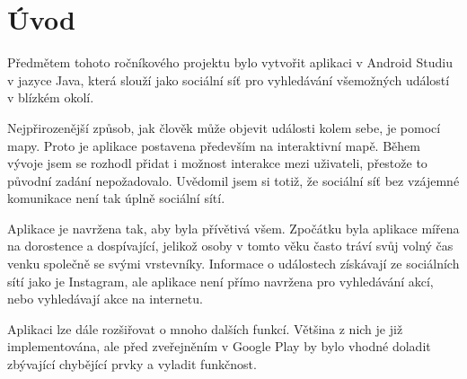 \chapter{Úvod}
Předmětem tohoto ročníkového projektu bylo vytvořit aplikaci v Android Studiu v jazyce Java, která slouží jako sociální síť pro vyhledávání všemožných událostí v blízkém okolí.

Nejpřirozenější způsob, jak člověk může objevit události kolem sebe, je pomocí mapy. Proto je aplikace postavena především na interaktivní mapě. Během vývoje jsem se rozhodl přidat i možnost interakce mezi uživateli, přestože to původní zadání nepožadovalo. Uvědomil jsem si totiž, že sociální síť bez vzájemné komunikace není tak úplně sociální sítí.

Aplikace je navržena tak, aby byla přívětivá všem. Zpočátku byla aplikace mířena na dorostence a dospívající, jelikož osoby v tomto věku často tráví svůj volný čas venku společně se svými vrstevníky. Informace o událostech získávají ze sociálních sítí jako je Instagram, ale aplikace není přímo navržena pro vyhledávání akcí, nebo vyhledávají akce na internetu.

Aplikaci lze dále rozšiřovat o mnoho dalších funkcí. Většina z nich je již implementována, ale před zveřejněním v Google Play by bylo vhodné doladit zbývající chybějící prvky a vyladit funkčnost.
